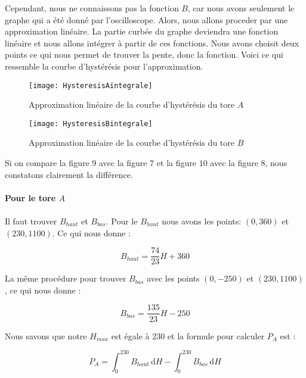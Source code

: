 \documentclass{article}
\begin{document}
\begin{description}
Cependant, nous ne connaissons pas la fonction $B$, car nous avons seulement le graphe qui a été donné par l'oscilloscope. Alors, nous allons proceder par une approximation linéaire. La partie curbée du graphe deviendra une fonction linéaire et nous allons intégrer à partir de ces fonctions. Nous avons choisit deux points ce qui nous permet de trouver la pente, donc la fonction. Voici ce qui ressemble la courbe d'hystérésis pour l'approximation.\\

\begin{figure}[h!]
\begin{center}
\texttt{[image: HysteresisAintegrale]}
\caption{Approximation linéaire de la courbe d'hystérésis du tore $A$}
\label{fig:montage9}
\end{center}
\end{figure}


\begin{figure}[h!]
\begin{center}
\texttt{[image: HysteresisBintegrale]}
\caption{Approximation linéaire de la courbe d'hystérésis du tore $B$}
\label{fig:montage10}
\end{center}
\end{figure}


\pagebreak

Si on compare la figure $9$ avec la figure $7$ et la figure $10$ avec la figure $8$, nous constatons clairement la différence.\\
\\
\textbf{Pour le tore $A$}\\
\\
Il faut trouver $B_{haut}$ et $B_{bas}$. Pour le $B_{haut}$ nous avons les points: $(0, 360)$ et $(230, 1100)$. Ce qui nous donne :

\begin{equation}
B_{haut} = \frac{74}{23}H + 360
\end{equation}

La même procédure pour trouver $B_{bas}$ avec les points $(0, -250)$ et $(230, 1100)$, ce qui nous donne :

\begin{equation}
B_{bas} = \frac{135}{23}H - 250
\end{equation}

Nous savons que notre $H_{max}$ est égale à 230 et la formule pour calculer $P_A$ est :

\begin{equation}
P_A = \int_0^{230}\! B_{haut}\,\mathrm{d}H - \int_0^{230}\! B_{bas}\,\mathrm{d}H
\end{equation}


\end{description}
\end{document}
